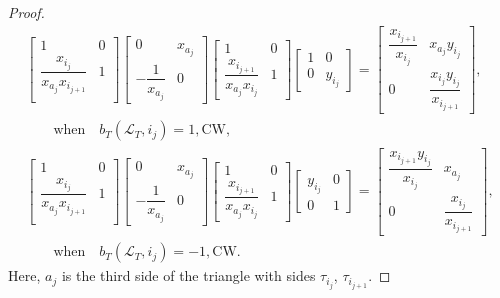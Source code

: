 \documentclass[pdftex]{sigma}
\numberwithin{equation}{section}
\theoremstyle{definition}
\begin{document}
\begin{proof}
\begin{gather}
 \begin{bmatrix}
 1 & 0\\
 \dfrac{x_{i_j}}{x_{a_j}x_{i_{j+1}}} & 1\\
 \end{bmatrix}
 \begin{bmatrix}
 0 & x_{a_j}\\
 -\dfrac{1}{x_{a_j}} & 0
 \end{bmatrix}
 \begin{bmatrix}
 1 & 0\\
 \dfrac{x_{i_{j+1}}}{x_{a_j}x_{i_j}} & 1
 \end{bmatrix}
 \begin{bmatrix}
 1 & 0\\
 0 & y_{i_j}
 \end{bmatrix}=
 \begin{bmatrix}
 \dfrac{x_{i_{j+1}}}{x_{i_j}} & x_{a_j}y_{i_j}\\
 0 & \dfrac{x_{i_j}y_{i_j}}{x_{i_{j+1}}}
 \end{bmatrix} ,\nonumber\\
 \qquad \text{when}\quad b_T(\mathcal{L}_T, i_j)=1, \text{CW},\label{eqn:cw+1}\\
 \begin{bmatrix}
 1 & 0\\
 \dfrac{x_{i_j}}{x_{a_j}x_{i_{j+1}}} & 1\\
 \end{bmatrix}
 \begin{bmatrix}
 0 & x_{a_j}\\
 -\dfrac{1}{x_{a_j}} & 0
 \end{bmatrix}
 \begin{bmatrix}
 1 & 0\\
 \dfrac{x_{i_{j+1}}}{x_{a_j}x_{i_j}} & 1
 \end{bmatrix}
 \begin{bmatrix}
 y_{i_j} & 0\\
 0 & 1
 \end{bmatrix}=
 \begin{bmatrix}
 \dfrac{x_{i_{j+1}}y_{i_j}}{x_{i_j}} & x_{a_j}\\
 0 & \dfrac{x_{i_j}}{x_{i_{j+1}}}
 \end{bmatrix}, \nonumber\\
\qquad \text{when}\quad b_T(\mathcal{L}_T, i_j)=-1, \text{CW}.\label{eqn:cw-1}
\end{gather}
Here, $a_j$ is the third side of the triangle with sides $\tau_{i_j}$, $\tau_{i_{j+1}}$.


\end{proof}
\end{document}
